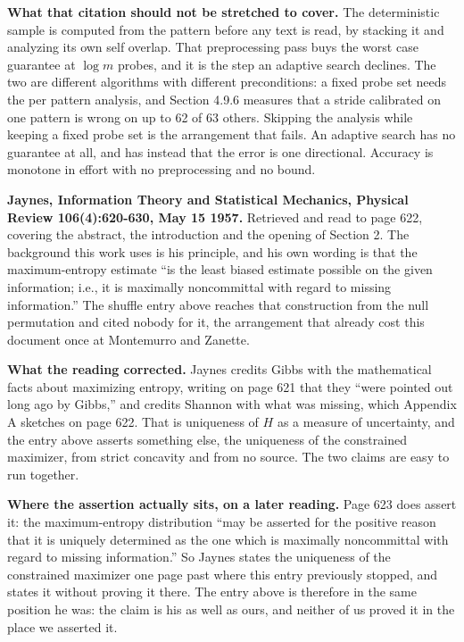 \textbf{What that citation should not be stretched to cover.} The deterministic sample is computed from the pattern before any text is read, by stacking it and analyzing its own self overlap. That preprocessing pass buys the worst case guarantee at \(\log m\) probes, and it is the step an adaptive search declines. The two are different algorithms with different preconditions: a fixed probe set needs the per pattern analysis, and Section 4.9.6 measures that a stride calibrated on one pattern is wrong on up to 62 of 63 others. Skipping the analysis while keeping a fixed probe set is the arrangement that fails. An adaptive search has no guarantee at all, and has instead that the error is one directional. Accuracy is monotone in effort with no preprocessing and no bound.

\textbf{Jaynes, Information Theory and Statistical Mechanics, Physical Review 106(4):620-630, May 15 1957.} Retrieved and read to page 622, covering the abstract, the introduction and the opening of Section 2. The background this work uses is his principle, and his own wording is that the maximum-entropy estimate
``is the least biased estimate possible on the given information; i.e., it is maximally noncommittal with regard to missing information.''
The shuffle entry above reaches that construction from the null permutation and cited nobody for it, the arrangement that already cost this document once at Montemurro and Zanette.

\textbf{What the reading corrected.} Jaynes credits Gibbs with the mathematical facts about maximizing entropy, writing on page 621 that they ``were pointed out long ago by Gibbs,'' and credits Shannon with what was missing, which Appendix A sketches on page 622. That is uniqueness of \(H\) as a measure of uncertainty, and the entry above asserts something else, the uniqueness of the constrained maximizer, from strict concavity and from no source. The two claims are easy to run together.

\textbf{Where the assertion actually sits, on a later reading.} Page 623 does assert it: the maximum-entropy distribution
``may be asserted for the positive reason that it is uniquely determined as the one which is maximally noncommittal with regard to missing information.''
So Jaynes states the uniqueness of the constrained maximizer one page past where this entry previously stopped, and states it without proving it there. The entry above is therefore in the same position he was: the claim is his as well as ours, and neither of us proved it in the place we asserted it.

